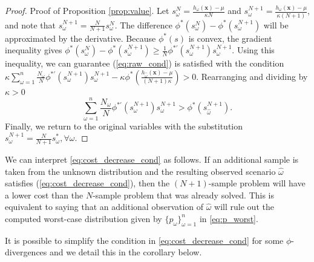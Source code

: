 \documentclass[opre,nonblindrev]{informs3} %
\newcommand{\x}{\mathbf{x}}
\begin{document}
\begin{proof}{\sc Proof of Proposition \ref{prop:value}.}
	Let $s^N_\omega = \frac{h_\omega(\x) - \mu}{\kappa N}$ and $s^{N+1}_\omega = \frac{h_\omega(\x) - \mu}{\kappa (N+1)}$, and note that $s^{N+1}_\omega = \tfrac{N}{N+1} s^N_\omega$.
	The difference $\phi^*(s^N_\omega) - \phi^*(s^{N+1}_\omega)$ will be approximated by the derivative.
Because $\phi^*(s)$ is convex, the gradient inequality gives $\phi^*(s^N_\omega) - \phi^*(s^{N+1}_\omega) \geq \frac{1}{N} \phi^{*\prime}(s^{N+1}_\omega) s^{N+1}_\omega$. 
	Using this inequality, we can guarantee (\ref{eq:raw_cond}) is satisfied with the condition $\kappa \sum_{\omega=1}^n \frac{N_\omega}{N} \phi^{*\prime}(s^{N+1}_\omega) s^{N+1}_\omega - \kappa \phi^*\left(\frac{h_{\hat{\omega}}(\x) - \mu}{(N+1)\kappa}\right) > 0$.
	 Rearranging and dividing by $\kappa > 0$
	\begin{equation*} %
		\sum_{\omega=1}^n \frac{N_\omega}{N} \phi^{*\prime}(s^{N+1}_\omega) s^{N+1}_\omega > \phi^*(s^{N+1}_{\hat{\omega}}).
	\end{equation*}
	Finally, we return to the original variables with the substitution $s^{N+1}_\omega = \frac{N}{N+1} s^*_\omega, \forall \omega$. 
	\Halmos
\end{proof}

We can interpret \eqref{eq:cost_decrease_cond} as follows. 
If an additional sample is taken from the unknown distribution and the resulting observed scenario $\hat{\omega}$ satisfies (\ref{eq:cost_decrease_cond}), then the $(N+1)$-sample problem will have a lower cost than the $N$-sample problem that was already solved.
This is equivalent to saying that an additional observation of $\hat{\omega}$ will rule out the computed worst-case distribution given by $\{p_\omega\}_{\omega=1}^{n}$ in \eqref{eq:p_worst}.

It is possible to simplify the condition in \eqref{eq:cost_decrease_cond} for some $\phi$-divergences and we detail this in the corollary below. 
\end{document}
